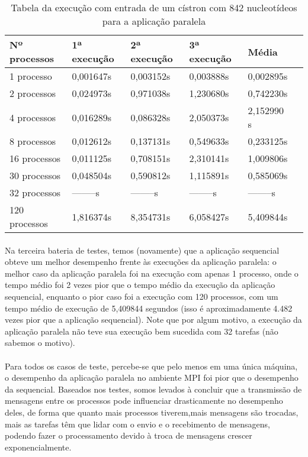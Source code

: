 \documentclass[a4paper,10pt]{article}
\begin{document}
\begin{table}[!htb]
\begin{tabular}{| l | l | l | l | l | p{5cm} |} 
\hline
Nº processos & 1ª execução & 2ª execução & 3ª execução & Média\\ \hline
1  processo & 0,001647s  &  0,003152s  &  0,003888s  &  0,002895s  \\ \hline
2 processos & 0,024973s  &  0,971038s  &  1,230680s  &  0,742230s   \\ \hline
4 processos & 0,016289s  &  0,086328s  &  2,050373s  & 2,152990 s   \\ \hline
8 processos & 0,012612s  &  0,137131s  &  0,549633s  &  0,233125s   \\ \hline
16 processos & 0,011125s  &  0,708151s  &  2,310141s  &  1,009806s     \\ \hline
30 processos & 0,048504s  &  0,590812s  &  1,115891s  &  0,585069s\\ \hline
32 processos & --------s  &  --------s  &  --------s  &  --------s  \\ \hline
120 processos & 1,816374s  &  8,354731s  &  6,058427s  &  5,409844s\\ \hline
\end{tabular}
\caption{Tabela da execução com entrada de um cístron com 842 nucleotídeos para a aplicação paralela}
\end{table}
\newpage

\paragraph{} Na terceira bateria de testes, temos (novamente) que a aplicação sequencial obteve um melhor desempenho frente às execuções da aplicação paralela: o melhor caso da aplicação paralela foi na execução com apenas 1 processo, onde o tempo médio foi 2 vezes pior que o tempo médio da execução da aplicação sequencial, enquanto o pior caso foi a execução com 120 processos, com um tempo médio de execução de 5,409844 segundos (isso é aproximadamente 4.482 vezes pior que a aplicação sequencial). Note que por algum motivo, a execução da aplicação paralela não teve sua execução bem sucedida com 32 tarefas (não sabemos o motivo).\\
\paragraph{}Para todos os casos de teste, percebe-se que pelo menos em uma única máquina, o desempenho da aplicação paralela no ambiente MPI foi pior que o desempenho da sequencial. Baseados nos testes, somos levados à concluir que a transmissão de mensagens entre os processos pode influenciar drasticamente no desempenho deles, de forma que quanto mais processos tiverem,mais mensagens são trocadas, mais as tarefas têm que lidar com o envio e o recebimento de mensagens, podendo fazer o processamento devido à troca de mensagens crescer exponencialmente.\\





\end{document}
